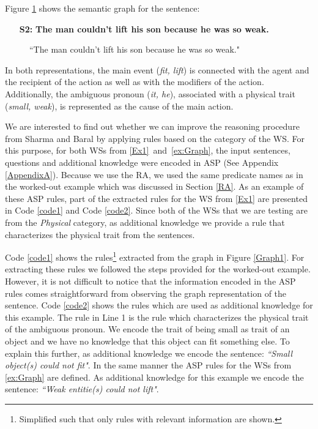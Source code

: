 Figure \ref{Graph2} shows the semantic graph for the sentence:

\begin{itemize}
	\item[\textbf{S2:}] \textbf{The man couldn't lift his son because he was so weak.}
\end{itemize} 


\begin{figure}[h!]
	\centering
	
	\caption{\label{Graph2}``The man couldn't lift his son because he was so weak."}
\end{figure}

In both representations, the main event (\textit{fit, lift}) is connected with the agent and the recipient of the action as well as with the modifiers of the action. Additionally, the ambiguous pronoun (\textit{it, he}),  associated with a physical trait (\textit{small, weak}), is represented as the cause of the main action. 

We are interested to find out whether we can improve the reasoning procedure from Sharma and Baral \cite{2018CommonsenseKT} 
by applying rules based on the category of the WS. 
For this purpose, for both WSs from \ref{Ex1}~and~\ref{ex:Graph}, the input sentences, questions and additional knowledge were encoded in ASP (See Appendix \ref{AppendixA}). Because we use the RA, we used the same predicate names as in the worked-out example which was discussed in Section \ref{RA}. As an example of these ASP rules, part of the extracted rules for the WS from \ref{Ex1} are presented in Code \ref{code1} and  Code \ref{code2}. 
Since both of the WSs that we are testing are from the \textit{Physical} category, as additional knowledge we provide a rule that characterizes the physical trait from the sentences. 

Code \ref{code1} shows the rules\footnote{Simplified such that only rules with relevant information are shown.} extracted from the graph in Figure \ref{Graph1}. For extracting these rules we followed the steps provided for the worked-out example. However, it is not difficult to notice that the information encoded in the ASP rules comes straightforward from observing the graph representation of the sentence.
Code \ref{code2} shows the rules which are used as additional knowledge for this example. The rule in Line 1 is the rule which characterizes the physical trait of the ambiguous pronoun. We encode the trait of being small as trait of an object and we have no knowledge that this object can fit something else. To explain this further, as additional knowledge we encode the sentence: \textit{``Small object(s) could not fit"}.
In the same manner the ASP rules for the WSs from \ref{ex:Graph} are defined. As additional knowledge for this example we encode the sentence: \textit{``Weak entitie(s) could not lift"}. 

